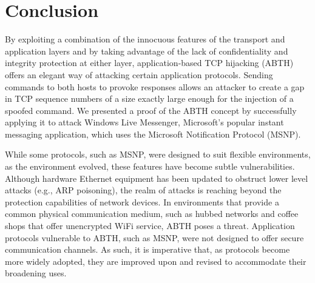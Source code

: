 \documentclass{sig-alternate}
\begin{document}
\section{Conclusion}
\label{sec:conclusion}

By exploiting a combination of the innocuous features of the transport and application layers and by taking advantage of the lack of confidentiality and integrity protection at either layer, application-based TCP hijacking (ABTH) offers an elegant way of attacking certain application protocols.
Sending commands to both hosts to provoke responses allows an attacker to create a gap in TCP sequence numbers of a size exactly large enough for the injection of a spoofed command.
We presented a proof of the ABTH concept by successfully applying it to attack Windows Live Messenger, Microsoft's popular instant messaging application, which uses the Microsoft Notification Protocol (MSNP).

While some protocols, such as MSNP, were designed to suit flexible environments, as the environment evolved, these features have become subtle vulnerabilities.
Although hardware Ethernet equipment has been updated to obstruct lower level attacks (e.g., ARP poisoning), the realm of attacks is reaching beyond the protection capabilities of network devices.
In environments that provide a common physical communication medium, such as hubbed networks and coffee shops that offer unencrypted WiFi service, ABTH poses a threat.
Application protocols vulnerable to ABTH, such as MSNP, were not designed to offer secure communication channels.
As such, it is imperative that, as protocols become more widely adopted, they are improved upon and revised to accommodate their broadening uses.

\vfil\eject



\end{document}
